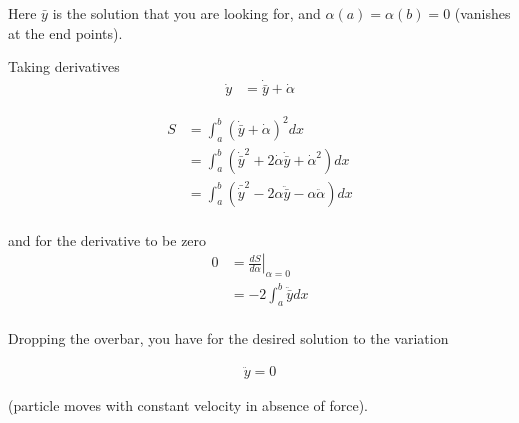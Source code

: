 Here $\bar{y}$ is the solution that you are looking for, and $\alpha(a) = \alpha(b) = 0$ (vanishes at the end points).

Taking derivatives
\begin{align*}
\dot{y} &= \dot{\bar{y}} + \dot{\alpha}
\end{align*}

\begin{align*}
S 
&= \int_{a}^b \left(\dot{\bar{y}} + \dot{\alpha} \right)^2 dx \\
&= \int_{a}^b \left(\dot{\bar{y}}^2 + 2 \dot{\alpha}\dot{\bar{y}} + \dot{\alpha}^2  \right) dx \\
&= \int_{a}^b \left(\bar{\dot{y}}^2 - 2 {\alpha}\ddot{\bar{y}} - {\alpha}\ddot{\alpha}  \right) dx \\
\end{align*}

and for the derivative to be zero
\begin{align*}
0 &= \left. \frac{dS }{d\alpha} \right\vert_{\alpha = 0} \\
&= -2 \int_{a}^b \ddot{\bar{y}} dx \\
\end{align*}

Dropping the overbar, you have for the desired solution to the variation

\begin{align*}
\ddot{y} = 0
\end{align*}

(particle moves with constant velocity in absence of force).

%
